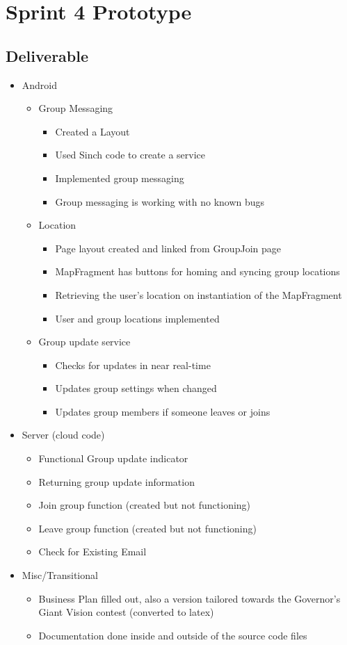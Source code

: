\section{Sprint 4 Prototype}
\subsection{Deliverable}
\begin{itemize}
	\item Android
	\begin{itemize}
		\item Group Messaging
		\begin{itemize}
			\item Created a Layout
			\item Used Sinch code to create a service
			\item Implemented group messaging
			\item Group messaging is working with no known bugs
			\end{itemize}
		\item Location
		\begin{itemize}
			\item Page layout created and linked from GroupJoin page
			\item MapFragment has buttons for homing and syncing group locations
			\item Retrieving the user's location on instantiation of the MapFragment
			\item User and group locations implemented
		\end{itemize}
		\item Group update service
		\begin{itemize}
			\item Checks for updates in near real-time
			\item Updates group settings when changed
			\item Updates group members if someone leaves or joins
		\end{itemize}
	\end{itemize}
	\item Server (cloud code)
	\begin{itemize}
		\item Functional Group update indicator
		\item Returning group update information
		\item Join group function (created but not functioning)
		\item Leave group function (created but not functioning)
		\item Check for Existing Email
	\end{itemize}	
	\item Misc/Transitional
	\begin{itemize}
		\item Business Plan filled out, also a version tailored towards the Governor's Giant Vision contest (converted to latex)
		\item Documentation done inside and outside of the source code files
	\end{itemize}
\end{itemize}
